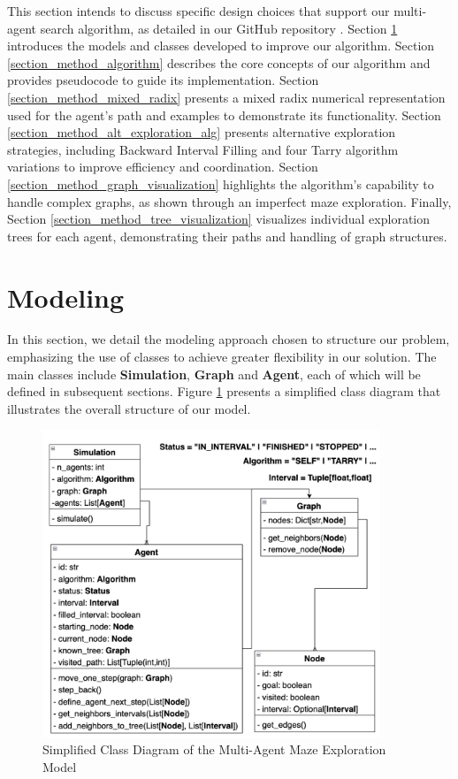 This section intends to discuss specific design choices that support
our multi-agent search algorithm, as detailed in our GitHub repository \cite{DiPiero2024}.
Section \ref{section_method_modeling} introduces the models and classes developed to improve our algorithm.
Section \ref{section_method_algorithm} describes the core concepts of our algorithm and provides pseudocode to guide its implementation.
Section \ref{section_method_mixed_radix} presents a mixed radix numerical representation used for the agent's path and examples to demonstrate its functionality.
Section \ref{section_method_alt_exploration_alg} presents alternative exploration strategies, including Backward Interval Filling and four Tarry algorithm variations to improve efficiency and coordination.
Section \ref{section_method_graph_visualization} highlights the algorithm's capability to handle complex graphs, as shown through an imperfect maze exploration.
Finally, Section \ref{section_method_tree_visualization} visualizes individual exploration trees for each agent, demonstrating their paths and handling of graph structures.

\section{Modeling}
\label{section_method_modeling}

In this section, we detail the modeling approach chosen to structure our problem,
emphasizing the use of classes to achieve greater flexibility in our solution.
The main classes include \textbf{Simulation}, \textbf{Graph} and \textbf{Agent}, each of which will be defined in subsequent sections.
Figure \ref{fig:class_diagram} presents a simplified class diagram that illustrates the overall structure of our model.

\begin{figure}[ht!]
    \centering
    \includegraphics[width=0.9\textwidth]{Cap2/simplified_class_diagram.png}
    \caption{Simplified Class Diagram of the Multi-Agent Maze Exploration Model}
    \label{fig:class_diagram}
\end{figure}

